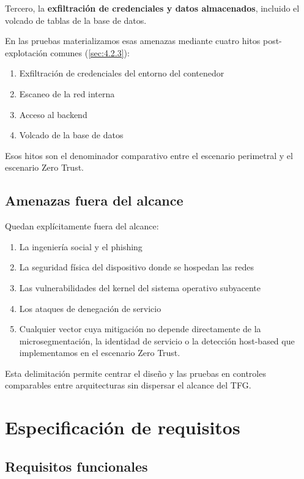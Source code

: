 \documentclass[11pt,spanish,listoffigures,listoftables]{tfgetsinf}
\begin{document}
        Tercero, la \textbf{exfiltración de credenciales y datos almacenados}, incluido el volcado de tablas de la base de datos.
        
        En las pruebas materializamos esas amenazas mediante cuatro hitos post-explotación comunes (\cref{sec:4.2.3}): 
        \begin{enumerate}
            \item Exfiltración de credenciales del entorno del contenedor
            \item Escaneo de la red interna
            \item Acceso al backend
            \item Volcado de la base de datos
        \end{enumerate}
        Esos hitos son el denominador comparativo entre el escenario perimetral y el escenario Zero Trust.
        
        \subsection{Amenazas fuera del alcance}
        \label{sec:3.2.5}
        Quedan explícitamente fuera del alcance:
        \begin{enumerate}
            \item La ingeniería social y el phishing
            \item La seguridad física del dispositivo donde se hospedan las redes
            \item Las vulnerabilidades del kernel del sistema operativo subyacente
            \item Los ataques de denegación de servicio
            \item Cualquier vector cuya mitigación no depende directamente de la microsegmentación, la identidad de servicio o la detección host-based que implementamos en el escenario Zero Trust.
        \end{enumerate}
        Esta delimitación permite centrar el diseño y las pruebas en controles comparables entre arquitecturas sin dispersar el alcance del TFG.

    \section{Especificación de requisitos}
        \subsection{Requisitos funcionales}
        \label{sec:3.3.1}
        
\end{document}
